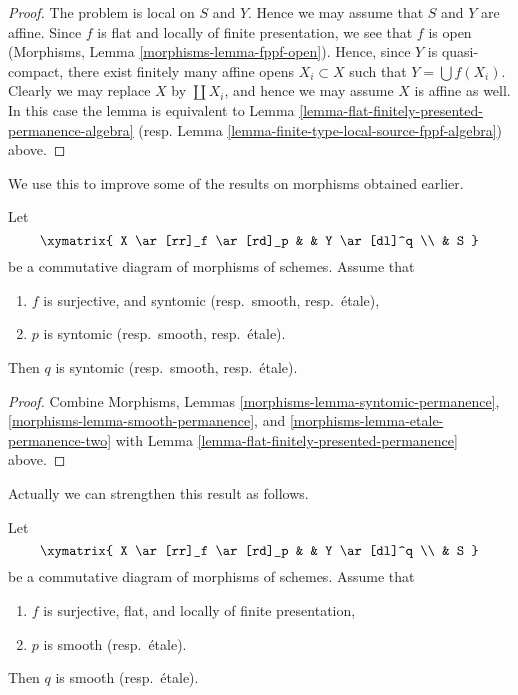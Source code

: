 \begin{proof}
The problem is local on $S$ and $Y$. Hence we may assume that
$S$ and $Y$ are affine. Since $f$ is flat and locally of finite
presentation, we see that $f$ is open
(Morphisms, Lemma \ref{morphisms-lemma-fppf-open}).
Hence, since $Y$ is quasi-compact, there exist finitely many affine opens
$X_i \subset X$ such that $Y = \bigcup f(X_i)$.
Clearly we may replace $X$ by $\coprod X_i$, and hence we
may assume $X$ is affine as well.
In this case the lemma is equivalent to
Lemma \ref{lemma-flat-finitely-presented-permanence-algebra}
(resp. Lemma \ref{lemma-finite-type-local-source-fppf-algebra})
above.
\end{proof}

\noindent
We use this to improve some of the results on morphisms
obtained earlier.

\begin{lemma}
\label{lemma-syntomic-smooth-etale-permanence}
Let
$$
\xymatrix{
X \ar[rr]_f \ar[rd]_p & &
Y \ar[dl]^q \\
& S
}
$$
be a commutative diagram of morphisms of schemes. Assume that
\begin{enumerate}
\item $f$ is surjective, and syntomic (resp.\ smooth, resp.\ \'etale),
\item $p$ is syntomic (resp.\ smooth, resp.\ \'etale).
\end{enumerate}
Then $q$ is syntomic (resp.\ smooth, resp.\ \'etale).
\end{lemma}

\begin{proof}
Combine Morphisms, Lemmas
\ref{morphisms-lemma-syntomic-permanence},
\ref{morphisms-lemma-smooth-permanence}, and
\ref{morphisms-lemma-etale-permanence-two}
with Lemma \ref{lemma-flat-finitely-presented-permanence} above.
\end{proof}

\noindent
Actually we can strengthen this result as follows.

\begin{lemma}
\label{lemma-smooth-permanence}
Let
$$
\xymatrix{
X \ar[rr]_f \ar[rd]_p & &
Y \ar[dl]^q \\
& S
}
$$
be a commutative diagram of morphisms of schemes. Assume that
\begin{enumerate}
\item $f$ is surjective, flat, and locally of finite presentation,
\item $p$ is smooth (resp.\ \'etale).
\end{enumerate}
Then $q$ is smooth (resp.\ \'etale).
\end{lemma}


